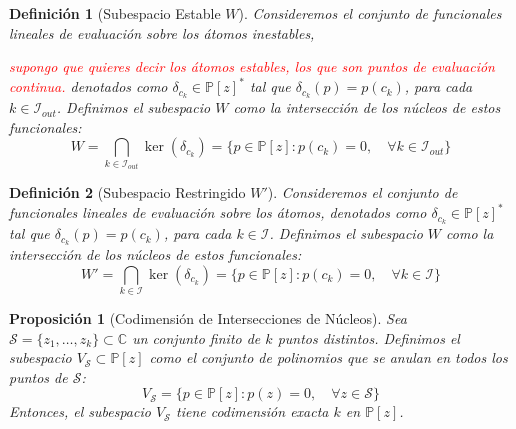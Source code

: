 \documentclass[12pt,a4paper]{article}
\newtheorem{definicion}{Definición}
\newtheorem{proposicion}{Proposición}
\newcommand{\C}{\mathbb{C}}
\newcommand{\Poly}{\mathbb{P}[z]}
\begin{document}
\begin{definicion}[Subespacio Estable $W$]
Consideremos el conjunto de funcionales lineales de evaluación sobre los átomos inestables, 

\textcolor{red}{supongo que quieres decir los átomos estables, los que son puntos de evaluación continua.}
denotados como $\delta_{c_k} \in \Poly^*$ tal que $\delta_{c_k}(p) = p(c_k)$, para cada $k \in \mathcal{I}_{out}$.
Definimos el subespacio $W$ como la intersección de los núcleos de estos funcionales:
\begin{equation}
    W = \bigcap_{k \in \mathcal{I}_{out}} \ker(\delta_{c_k}) = \{ p \in \Poly : p(c_k) = 0, \quad \forall k \in \mathcal{I}_{out} \}
\end{equation}
\end{definicion}

\begin{definicion}[Subespacio Restringido $W'$]
Consideremos el conjunto de funcionales lineales de evaluación sobre los átomos, denotados como $\delta_{c_k} \in \Poly^*$ tal que $\delta_{c_k}(p) = p(c_k)$, para cada $k \in \mathcal{I}$.
Definimos el subespacio $W$ como la intersección de los núcleos de estos funcionales:
\begin{equation}
   W' = \bigcap_{k \in \mathcal{I}} \ker(\delta_{c_k}) = \{ p \in \Poly : p(c_k) = 0, \quad \forall k \in \mathcal{I} \}
\end{equation}
\end{definicion}

\begin{proposicion}[Codimensión de Intersecciones de Núcleos]
Sea $\mathcal{S} = \{z_1, \dots, z_k\} \subset \C$ un conjunto finito de $k$ puntos distintos. Definimos el subespacio $V_{\mathcal{S}} \subset \Poly$ como el conjunto de polinomios que se anulan en todos los puntos de $\mathcal{S}$:
$$ V_{\mathcal{S}} = \{ p \in \Poly : p(z) = 0, \quad \forall z \in \mathcal{S} \} $$
Entonces, el subespacio $V_{\mathcal{S}}$ tiene codimensión exacta $k$ en $\Poly$.
\end{proposicion}
\end{document}
